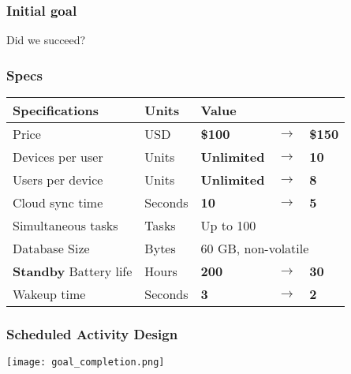 \documentclass{beamer}
\begin{document}
\begin{frame}
  \frametitle{Initial goal}

  

  \begin{center}
    Did we succeed?
  \end{center}

\end{frame}

\begin{frame}
  \frametitle{Specs}
  \centering
    \begin{tabular}{lllll}
    \hline
    Specifications                & Units   & \multicolumn{3}{l}{Value}                        \\
    \hline
    Price                         & USD     & \textbf{\$100}     & \textbf{$\rightarrow$} & \textbf{\$150} \\
    Devices per user              & Units   & \textbf{Unlimited} & \textbf{$\rightarrow$} & \textbf{10}    \\
    Users per device              & Units   & \textbf{Unlimited} & \textbf{$\rightarrow$} & \textbf{8}     \\
    Cloud sync time               & Seconds & \textbf{10}        & \textbf{$\rightarrow$} & \textbf{5}     \\
    Simultaneous tasks             & Tasks   & \multicolumn{3}{l}{Up to 100}                    \\
    Database Size                 & Bytes   & \multicolumn{3}{l}{60 GB, non-volatile}          \\
    \textbf{Standby} Battery life & Hours   & \textbf{200}       & \textbf{$\rightarrow$} & \textbf{30}    \\
    Wakeup time                   & Seconds & \textbf{3}         & \textbf{$\rightarrow$} & \textbf{2}    \\
    \hline
    \end{tabular}
\end{frame}

\begin{frame}
  \frametitle{Scheduled Activity Design}

  \texttt{[image: goal\_completion.png]}

  

\end{frame}
\end{document}
